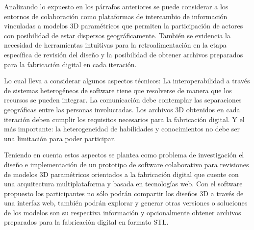Analizando lo expuesto en los párrafos anteriores se puede considerar a los entornos de colaboración como plataformas de intercambio de información vinculadas a modelos 3D paramétricos que permiten la participación de actores con posibilidad de estar dispersos geográficamente. También se evidencia la necesidad de herramientas intuitivas para la retroalimentación en la etapa específica de revisión del diseño y la posibilidad de obtener archivos preparados para la fabricación digital en cada iteración. 

Lo cual lleva a considerar algunos aspectos técnicos:
La interoperabilidad a través de sistemas heterogéneos de software tiene que resolverse de manera que los recursos se pueden integrar.
La comunicación debe contemplar las separaciones geográficas entre las personas involucradas. 
Los archivos 3D obtenidos en cada iteración deben cumplir los requisitos necesarios para la fabricación digital.
Y el más importante: la heterogeneidad de habilidades y conocimientos no debe ser una limitación para poder participar.

Teniendo en cuenta estos aspectos se plantea como problema de investigación el diseño e implementación de un prototipo de software colaborativo para revisiones de modelos 3D paramétricos orientados a la fabricación digital que cuente con una arquitectura multiplataforma y basada en tecnologías web.
Con el software propuesto los participantes no sólo podrán compartir los diseños 3D a través de una interfaz web, también podrán explorar y generar otras versiones o soluciones de los modelos son su respectiva información y opcionalmente obtener archivos preparados para la fabricación digital en formato STL.

	

